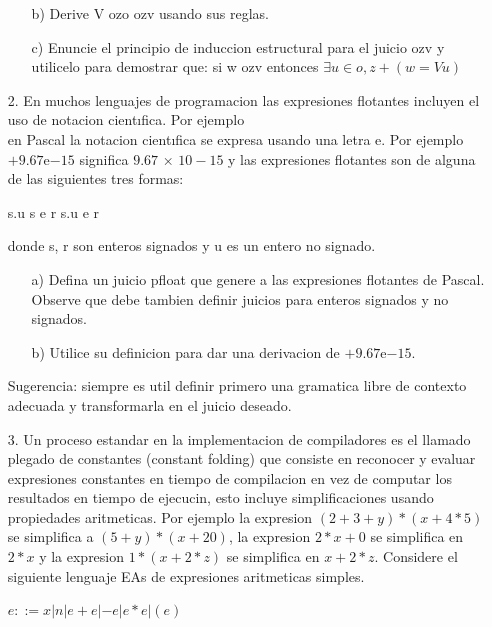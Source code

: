 \documentclass{article}
\begin{document}
\begin{itemize}
\begin{itemize}
                \item[b)] Derive V ozo ozv usando sus reglas.
                \item[c)] Enuncie el principio de induccion estructural para el juicio ozv y utilicelo para demostrar que: si w ozv entonces $\exists u \in {o, z}+ (w = V u)$ 
            \end{itemize} 
        \item[2.] En muchos lenguajes de programacion las expresiones flotantes incluyen el uso de notacion cientıfica. Por ejemplo\\
        en Pascal la notacion cientıfica se expresa usando una letra e. Por ejemplo $+9.67$e$-15$ significa $9.67$ × $10-15$ y las expresiones flotantes son de alguna de las siguientes tres formas:
            \begin{center}
                s.u s e r s.u e r
            \end{center}
        donde s, r son enteros signados y u es un entero no signado.
            \begin{itemize}
                \item[a)] Defina un juicio pfloat que genere a las expresiones flotantes de Pascal. Observe que debe tambien definir juicios para enteros signados y no signados.
                \item[b)] Utilice su definicion para dar una derivacion de $+9.67$e$-15$.
            \end{itemize}
        Sugerencia: siempre es util definir primero una gramatica libre de contexto adecuada y transformarla en el juicio deseado.

        \item[3.] Un proceso estandar en la implementacion de compiladores es el llamado plegado de constantes (constant folding) que consiste en reconocer y evaluar expresiones constantes en tiempo de compilacion en vez de computar los resultados en tiempo de ejecucin, esto incluye simplificaciones usando propiedades aritmeticas. Por ejemplo la expresion $(2+3+y)*(x+4*5)$ se simplifica a $(5 + y)*(x + 20)$, la expresion $2 * x + 0$ se simplifica en $2 * x$ y la expresion $1 * (x + 2 * z)$ se simplifica en $x + 2 * z$. Considere el siguiente lenguaje EAs de expresiones aritmeticas simples.
            \begin{center}
                $e ::= x | n | e + e | -e | e * e | (e)$
            \end{center}
    

\end{itemize}
\end{document}
